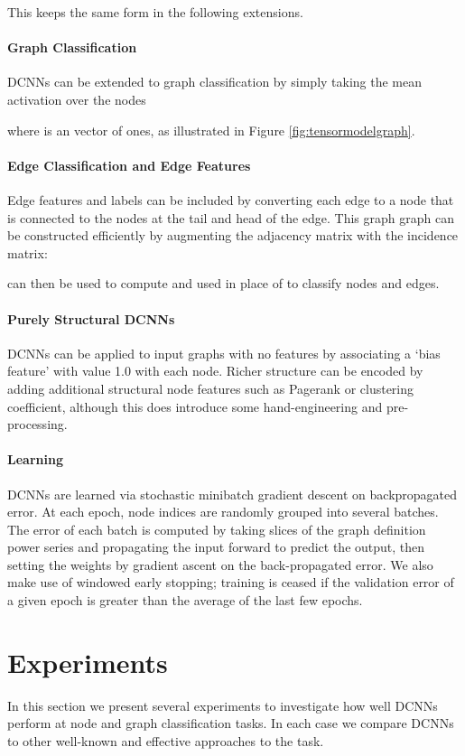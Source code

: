 \documentclass{article}
\begin{document}
This keeps the same form in the following extensions.

\paragraph{Graph Classification}
DCNNs can be extended to graph classification by simply taking the mean activation over the nodes

where  is an  vector of ones, as illustrated in Figure \ref{fig:tensormodelgraph}.

\paragraph{Edge Classification and Edge Features}
Edge features and labels can be included by converting each edge to a node that is connected to the nodes at the tail and head of the edge.  This graph graph can be constructed efficiently by augmenting the adjacency matrix with the incidence matrix:

  can then be used to compute  and used in place of  to classify nodes and edges.

\paragraph{Purely Structural DCNNs}
DCNNs can be applied to input graphs with no features by associating a `bias feature' with value 1.0 with each node.  Richer structure can be encoded by adding additional structural node features such as Pagerank or  clustering coefficient, although this does introduce some hand-engineering and pre-processing.

\paragraph{Learning}
DCNNs are learned via stochastic minibatch gradient descent on backpropagated error.  At each epoch, node indices are randomly grouped into several batches.  The error of each batch is computed by taking slices of the graph definition power series and propagating the input forward to predict the output, then setting the weights by gradient ascent on the back-propagated error.  We also make use of windowed early stopping; training is ceased if the validation error of a given epoch is greater than the average of the last few epochs.

\section{Experiments}
\label{sec:experiments}
In this section we present several experiments to investigate how well DCNNs perform at node and graph classification tasks.  In each case we compare DCNNs to other well-known and effective approaches to the task.
\end{document}
